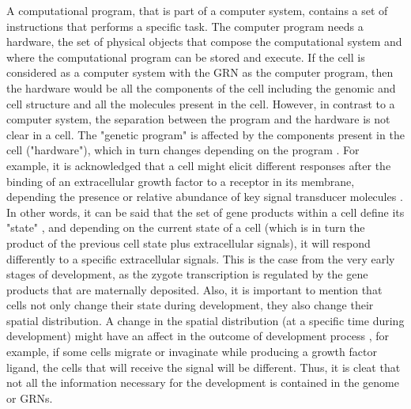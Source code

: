 A computational program, that is part of a computer system, contains a set of instructions that performs a specific task. The computer program needs a hardware, the set of physical objects that compose the computational system and where the computational program can be stored and execute.
If the cell is considered as a computer system with the GRN as the computer program, then the hardware would be all the components of the cell including the genomic and cell structure and all the molecules present in the cell.
However, in contrast to a computer system, the separation between the program and the hardware is not clear in a cell. The "genetic program" is affected by the components present in the cell ("hardware"), which in turn changes depending on the program \citep{susan2000ontogeny,Jaeger2014devmech}.  For example, it is acknowledged that a cell might elicit different responses after the binding of an extracellular growth factor to a receptor in its membrane, depending the presence or relative abundance of key signal transducer molecules \citep{Dailey2005}. In other words, it can be said that the set of gene products within a cell define its "state" \citep{Forgacs_Newman2005}, and depending on the current state of a cell (which is in turn the product of the previous cell state plus extracellular signals), it will respond differently to a specific extracellular signals. This is the case from the very early stages of development, as the zygote transcription is regulated by the gene products that are maternally deposited. Also, it is important to mention that cells not only change their state during development, they also change their spatial distribution. A change in the spatial distribution (at a specific time during development) might have an affect in the outcome of development process \citep{Salazar-Ciudad2010}, for example, if some cells migrate or invaginate while producing a growth factor ligand, the cells that will receive the signal will be different. Thus, it is cleat that not all the information necessary for the development is contained in the genome or GRNs.
